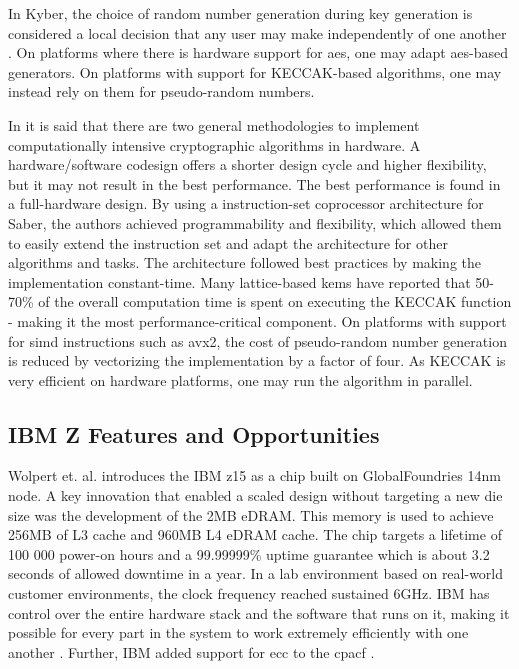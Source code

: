 In Kyber, the choice of random number generation during key generation is considered a local decision that any user may make independently of one another \cite{kyber2021}. On platforms where there is hardware support for \gls{aes}, one may adapt \gls{aes}-based generators. On platforms with support for KECCAK-based algorithms, one may instead rely on them for pseudo-random numbers.


In \cite{roy2020} it is said that there are two general methodologies to implement computationally intensive cryptographic algorithms in hardware. A hardware/software codesign offers a shorter design cycle and higher flexibility, but it may not result in the best performance. The best performance is found in a full-hardware design. By using a instruction-set coprocessor architecture for Saber, the authors achieved programmability and flexibility, which allowed them to easily extend the instruction set and adapt the architecture for other algorithms and tasks. The architecture followed best practices by making the implementation constant-time. Many lattice-based \glspl{kem} have reported that 50-70\% of the overall computation time is spent on executing the KECCAK function - making it the most performance-critical component. On platforms with support for \gls{simd} instructions such as \gls{avx2}, the cost of pseudo-random number generation is reduced by vectorizing the implementation by a factor of four. As KECCAK is very efficient on hardware platforms, one may run the algorithm in parallel.

\subsection{IBM Z Features and Opportunities} 

Wolpert et. al. \cite{wolpert2020} introduces the IBM \gls{z15} as a chip built on GlobalFoundries 14nm node. A key innovation that enabled a scaled design without targeting a new die size was the development of the 2MB eDRAM. This memory is used to achieve 256MB of L3 cache and 960MB L4 eDRAM cache. The chip targets a lifetime of 100 000 power-on hours and a 99.99999\% uptime guarantee which is about 3.2 seconds of allowed downtime in a year. In a lab environment based on real-world customer environments, the clock frequency reached sustained 6GHz. IBM has control over the entire hardware stack and the software that runs on it, making it possible for every part in the system to work extremely efficiently with one another \cite{wolpert2020}. Further, IBM added support for \gls{ecc} to the \gls{cpacf} \cite{berry2020}.

